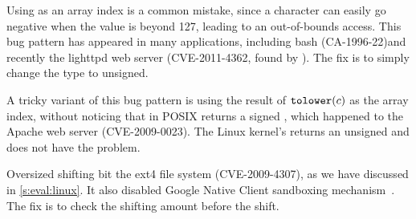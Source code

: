 Using  as an array index is a common mistake, since a
character can easily go negative when the value is beyond 127,
leading to an out-of-bounds access.  This bug pattern has appeared
in many applications, including bash (CA-1996-22)and recently the lighttpd
web server (CVE-2011-4362, found by
\sys).  The fix is to simply change the type to unsigned.

A tricky variant of this bug pattern is using the result of
$\texttt{tolower}(c)$ as the array index, without noticing that in POSIX
 returns a signed , which happened to the Apache
web server (CVE-2009-0023).  The Linux kernel's  returns
an unsigned  and does not have the problem.

Oversized shifting bit the ext4 file system (CVE-2009-4307),
as we have discussed in \autoref{s:eval:linux}.
It also disabled Google Native Client sandboxing mechanism~\cite{nacl}.
The fix is to check the shifting amount before the shift.

